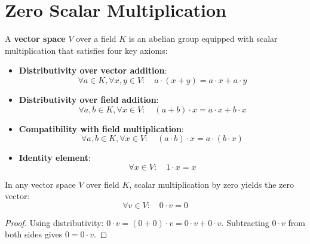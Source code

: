 \section{Zero Scalar Multiplication}

\begin{definition}
  \label{definition : VectorSpace}
  \leanok
  A \textbf{vector space} $V$ over a field $K$ is an abelian group equipped with scalar multiplication that satisfies four key axioms:
  \begin{itemize}
    \item \textbf{Distributivity over vector addition}: 
    $$\forall a \in K, \forall x,y \in V: \quad a \cdot (x + y) = a \cdot x + a \cdot y$$
    \item \textbf{Distributivity over field addition}: 
    $$\forall a,b \in K, \forall x \in V: \quad (a + b) \cdot x = a \cdot x + b \cdot x$$
    \item \textbf{Compatibility with field multiplication}: 
    $$\forall a,b \in K, \forall x \in V: \quad (a \cdot b) \cdot x = a \cdot (b \cdot x)$$
    \item \textbf{Identity element}: 
    $$\forall x \in V: \quad 1 \cdot x = x$$
  \end{itemize}
\end{definition}

\begin{theorem}
  \label{theorem : zero_smul}
  \leanok
  In any vector space $V$ over field $K$, scalar multiplication by zero yields the zero vector:
  $$\forall v \in V: \quad 0 \cdot v = 0$$
\end{theorem}

\begin{proof}
  Using distributivity: $0 \cdot v = (0 + 0) \cdot v = 0 \cdot v + 0 \cdot v$. Subtracting $0 \cdot v$ from both sides gives $0 = 0 \cdot v$.
\end{proof}
